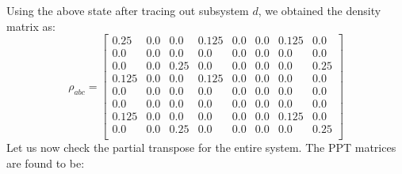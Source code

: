 \documentclass{scrartcl}
\begin{document}
Using the above state after tracing out subsystem $d$, we obtained the density matrix as:
\begin{equation*}
    \rho_{abc}=
    \left[
    \begin{array}{cccccccc}
    0.25 & 0.0 & 0.0 & 0.125 & 0.0 & 0.0 & 0.125 & 0.0 \\
    0.0 & 0.0 & 0.0 & 0.0 & 0.0 & 0.0 & 0.0 & 0.0 \\
    0.0 & 0.0 & 0.25 & 0.0 & 0.0 & 0.0 & 0.0 & 0.25 \\
    0.125 & 0.0 & 0.0 & 0.125 & 0.0 & 0.0 & 0.0 & 0.0 \\
    0.0 & 0.0 & 0.0 & 0.0 & 0.0 & 0.0 & 0.0 & 0.0 \\
    0.0 & 0.0 & 0.0 & 0.0 & 0.0 & 0.0 & 0.0 & 0.0 \\
    0.125 & 0.0 & 0.0 & 0.0 & 0.0 & 0.0 & 0.125 & 0.0 \\
    0.0 & 0.0 & 0.25 & 0.0 & 0.0 & 0.0 & 0.0 & 0.25 \\
    \end{array}
    \right]
    \end{equation*}
    Let us now check the partial transpose for the entire system. The PPT matrices are found to be:\\
\end{document}
